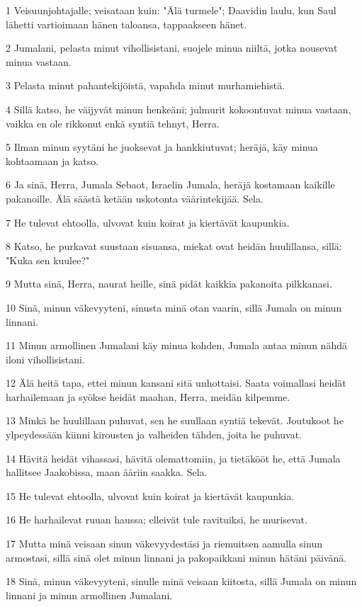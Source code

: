 \par 1 Veisuunjohtajalle; veisataan kuin: "Älä turmele"; Daavidin laulu, kun Saul lähetti vartioimaan hänen taloansa, tappaakseen hänet.
\par 2 Jumalani, pelasta minut vihollisistani, suojele minua niiltä, jotka nousevat minua vastaan.
\par 3 Pelasta minut pahantekijöistä, vapahda minut murhamiehistä.
\par 4 Sillä katso, he väijyvät minun henkeäni; julmurit kokoontuvat minua vastaan, vaikka en ole rikkonut enkä syntiä tehnyt, Herra.
\par 5 Ilman minun syytäni he juoksevat ja hankkiutuvat; heräjä, käy minua kohtaamaan ja katso.
\par 6 Ja sinä, Herra, Jumala Sebaot, Israelin Jumala, heräjä kostamaan kaikille pakanoille. Älä säästä ketään uskotonta väärintekijää. Sela.
\par 7 He tulevat ehtoolla, ulvovat kuin koirat ja kiertävät kaupunkia.
\par 8 Katso, he purkavat suustaan sisuansa, miekat ovat heidän huulillansa, sillä: "Kuka sen kuulee?"
\par 9 Mutta sinä, Herra, naurat heille, sinä pidät kaikkia pakanoita pilkkanasi.
\par 10 Sinä, minun väkevyyteni, sinusta minä otan vaarin, sillä Jumala on minun linnani.
\par 11 Minun armollinen Jumalani käy minua kohden, Jumala antaa minun nähdä iloni vihollisistani.
\par 12 Älä heitä tapa, ettei minun kansani sitä unhottaisi. Saata voimallasi heidät harhailemaan ja syökse heidät maahan, Herra, meidän kilpemme.
\par 13 Minkä he huulillaan puhuvat, sen he suullaan syntiä tekevät. Joutukoot he ylpeydessään kiinni kirousten ja valheiden tähden, joita he puhuvat.
\par 14 Hävitä heidät vihassasi, hävitä olemattomiin, ja tietäkööt he, että Jumala hallitsee Jaakobissa, maan ääriin saakka. Sela.
\par 15 He tulevat ehtoolla, ulvovat kuin koirat ja kiertävät kaupunkia.
\par 16 He harhailevat ruuan haussa; elleivät tule ravituiksi, he murisevat.
\par 17 Mutta minä veisaan sinun väkevyydestäsi ja riemuitsen aamulla sinun armostasi, sillä sinä olet minun linnani ja pakopaikkani minun hätäni päivänä.
\par 18 Sinä, minun väkevyyteni, sinulle minä veisaan kiitosta, sillä Jumala on minun linnani ja minun armollinen Jumalani.

